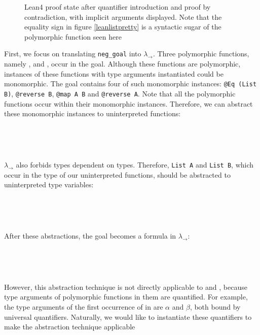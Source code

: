 \begin{figure}
  \begin{CenteredBox}
    
  \end{CenteredBox}
  \caption{Lean4 proof state after quantifier introduction and proof by contradiction, with implicit arguments displayed.
    Note that the equality sign in figure \ref{leanlistpretty} is a syntactic sugar of
    the polymorphic function {\usebox{\vEq}} seen here}
  \label{leanlistexplicit}
\end{figure}

First, we focus on translating \texttt{neg\_goal} into $\lambda_\to$. Three polymorphic functions,
namely \usebox{\vEq}, \usebox{\vmap} and \usebox{\vrev}, occur in the goal.
Although these functions are polymorphic, instances of these functions
with type arguments instantiated could be monomorphic. The goal contains four of
such monomorphic instances: \texttt{@Eq (List B)}, \texttt{@reverse B}, \texttt{@map A B}
and \texttt{@reverse A}. Note that all the polymorphic functions occur
within their monomorphic instances. Therefore, we can abstract these monomorphic
instances to uninterpreted functions:

\

\begin{CenteredBox}
    
\end{CenteredBox}
\

$\lambda_\to$ also forbids types dependent on types.
Therefore, \texttt{List A} and \texttt{List B}, which occur in the type of our
uninterpreted functions, should be abstracted to uninterpreted type variables:

\

\begin{CenteredBox}
  
\end{CenteredBox}
\

After these abstractions, the goal becomes a formula in $\lambda_\to$:

\

\begin{CenteredBox}
    
\end{CenteredBox}
\

However, this abstraction technique is not directly applicable to \usebox{\vmaprev} and
\usebox{\vrevrev}, because type arguments of polymorphic functions in them are quantified. For
example, the type arguments of the first occurrence of \usebox{\vmap} in \usebox{\vmaprev}
are $\alpha$ and $\beta$, both bound by universal quantifiers. Naturally, we would like
to instantiate these quantifiers to make the abstraction technique applicable

